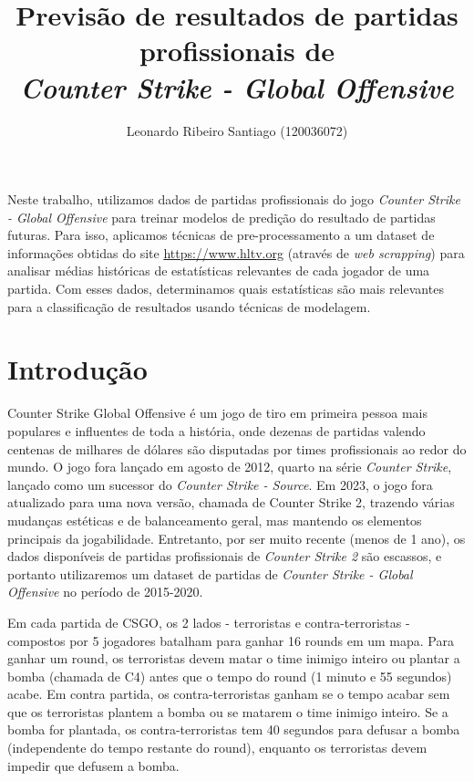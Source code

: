\documentclass[12pt]{article}
\title{Previsão de resultados de partidas profissionais de \\ \textit{Counter Strike - Global Offensive}}
\author{Leonardo Ribeiro Santiago (120036072)\inst{1} }
\begin{document}
 

\maketitle

\begin{resumo}
  Neste trabalho, utilizamos dados de partidas profissionais do jogo \textit{Counter Strike - Global Offensive} para treinar modelos de predição do resultado de partidas futuras. Para isso, aplicamos técnicas de pre-processamento a um dataset de informações obtidas do site \url{https://www.hltv.org} (através de \textit{web scrapping}) para analisar médias históricas de estatísticas relevantes de cada jogador de uma partida. Com esses dados, determinamos quais estatísticas são mais relevantes para a classificação de resultados usando técnicas de modelagem.
\end{resumo}

\section{Introdução}

Counter Strike Global Offensive é um jogo de tiro em primeira pessoa mais populares e influentes de toda a história, onde dezenas de partidas valendo centenas de milhares de dólares são disputadas por times profissionais ao redor do mundo. O jogo fora lançado em agosto de 2012, quarto na série \textit{Counter Strike}, lançado como um sucessor do \textit{Counter Strike - Source}. Em 2023, o jogo fora atualizado para uma nova versão, chamada de Counter Strike 2, trazendo várias mudanças estéticas e de balanceamento geral, mas mantendo os elementos principais da jogabilidade. Entretanto, por ser muito recente (menos de 1 ano), os dados disponíveis de partidas profissionais de \textit{Counter Strike 2} são escassos, e portanto utilizaremos um dataset de partidas de \textit{Counter Strike - Global Offensive} no período de 2015-2020.

Em cada partida de CSGO, os 2 lados - terroristas e contra-terroristas - compostos por 5 jogadores batalham para ganhar 16 rounds em um mapa. Para ganhar um round, os terroristas devem matar o time inimigo inteiro ou plantar a bomba (chamada de C4) antes que o tempo do round (1 minuto e 55 segundos) acabe. Em contra partida, os contra-terroristas ganham se o tempo acabar sem que os terroristas plantem a bomba ou se matarem o time inimigo inteiro. Se a bomba for plantada, os contra-terroristas tem 40 segundos para defusar a bomba (independente do tempo restante do round), enquanto os terroristas devem impedir que defusem a bomba.
\end{document}
